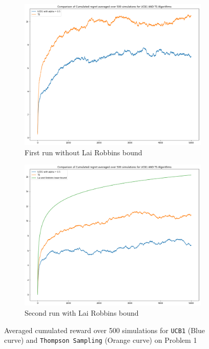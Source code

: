\documentclass[11pt]{article}
\numberwithin{figure}{section} %
\begin{document}
\begin{figure}[H]
    \centering
    \begin{subfigure}{.5\textwidth}
        \centering
        \includegraphics[width=1\linewidth]{images/easy_ucb_v_ts_nolr}
        \caption{First run without Lai Robbins bound}
        \label{fig:easy_without_lr}
    \end{subfigure}%
    \begin{subfigure}{.5\textwidth}
        \centering
        \includegraphics[width=1\linewidth]{images/easy_ucb_v_ts}
        \caption{Second run with Lai Robbins bound}
        \label{fig:easy_lr}
    \end{subfigure}
		\caption{Averaged cumulated reward over 500 simulations for \texttt{UCB1} (Blue curve) and \texttt{Thompson Sampling} (Orange curve) on Problem 1}
\label{fig:easy_ucb_v_ts}
\end{figure}
\end{document}
